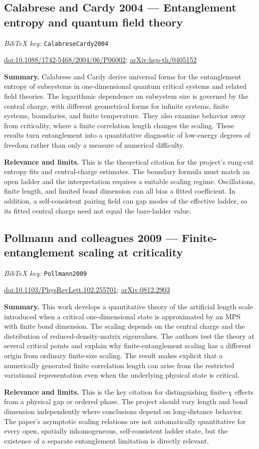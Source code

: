 \documentclass[11pt]{article}
\newcommand{\paper}[2]{\Needspace{8\baselineskip}\subsection{#2}\label{paper:#1}\textit{BibTeX key:} \texttt{#1}\quad\citep{#1}\par}
\newcommand{\doi}[1]{\href{https://doi.org/#1}{doi:#1}}
\newcommand{\arxiv}[1]{\href{https://arxiv.org/abs/#1}{arXiv:#1}}
\newcommand{\summary}{\par\textbf{Summary.} }
\newcommand{\relevance}{\par\textbf{Relevance and limits.} }
\begin{document}
\paper{CalabreseCardy2004}{Calabrese and Cardy 2004 --- Entanglement entropy and quantum field theory}
\doi{10.1088/1742-5468/2004/06/P06002}; \arxiv{hep-th/0405152}
\summary Calabrese and Cardy derive universal forms for the entanglement entropy of subsystems in one-dimensional quantum critical systems and related field theories. The logarithmic dependence on subsystem size is governed by the central charge, with different geometrical forms for infinite systems, finite systems, boundaries, and finite temperature. They also examine behavior away from criticality, where a finite correlation length changes the scaling. These results turn entanglement into a quantitative diagnostic of low-energy degrees of freedom rather than only a measure of numerical difficulty.
\relevance This is the theoretical citation for the project's rung-cut entropy fits and central-charge estimates. The boundary formula must match an open ladder and the interpretation requires a suitable scaling regime. Oscillations, finite length, and limited bond dimension can all bias a fitted coefficient. In addition, a self-consistent pairing field can gap modes of the effective ladder, so its fitted central charge need not equal the bare-ladder value.

\paper{Pollmann2009}{Pollmann and colleagues 2009 --- Finite-entanglement scaling at criticality}
\doi{10.1103/PhysRevLett.102.255701}; \arxiv{0812.2903}
\summary This work develops a quantitative theory of the artificial length scale introduced when a critical one-dimensional state is approximated by an MPS with finite bond dimension. The scaling depends on the central charge and the distribution of reduced-density-matrix eigenvalues. The authors test the theory at several critical points and explain why finite-entanglement scaling has a different origin from ordinary finite-size scaling. The result makes explicit that a numerically generated finite correlation length can arise from the restricted variational representation even when the underlying physical state is critical.
\relevance This is the key citation for distinguishing finite-$\chi$ effects from a physical gap or ordered phase. The project should vary length and bond dimension independently where conclusions depend on long-distance behavior. The paper's asymptotic scaling relations are not automatically quantitative for every open, spatially inhomogeneous, self-consistent ladder state, but the existence of a separate entanglement limitation is directly relevant.
\end{document}
